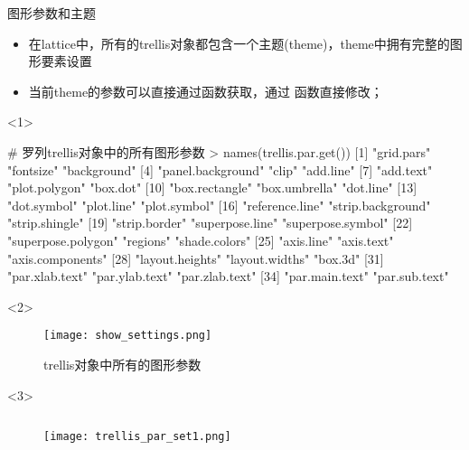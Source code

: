 \begin{frame}[t,fragile]{\subsecname}{图形参数和主题}
\begin{itemize}
\item 在lattice中，所有的trellis对象都包含一个主题(theme)，theme中拥有完整的图形要素设置
\item 当前theme的参数可以直接通过函数获取，通过
函数直接修改；
\end{itemize}

\begin{overlayarea}{\textwidth}{\textheight}
\begin{onlyenv}<1>
\begin{rcode}
# 罗列trellis对象中的所有图形参数
> names(trellis.par.get())
 [1] "grid.pars"         "fontsize"          "background"       
 [4] "panel.background"  "clip"              "add.line"         
 [7] "add.text"          "plot.polygon"      "box.dot"          
[10] "box.rectangle"     "box.umbrella"      "dot.line"         
[13] "dot.symbol"        "plot.line"         "plot.symbol"      
[16] "reference.line"    "strip.background"  "strip.shingle"    
[19] "strip.border"      "superpose.line"    "superpose.symbol" 
[22] "superpose.polygon" "regions"           "shade.colors"     
[25] "axis.line"         "axis.text"         "axis.components"  
[28] "layout.heights"    "layout.widths"     "box.3d"           
[31] "par.xlab.text"     "par.ylab.text"     "par.zlab.text"    
[34] "par.main.text"     "par.sub.text"    
\end{rcode}
\end{onlyenv}

\vspace{-10pt}
\begin{onlyenv}<2>
\begin{figure}[ht]
  \centering
  \texttt{[image: show\_settings.png]}
  \caption{trellis对象中所有的图形参数}
\end{figure}
\end{onlyenv}

\begin{onlyenv}<3>
\begin{figure}
 \begin{columns}
    \begin{column}[c]{.4\textwidth}
        \texttt{[image: trellis\_par\_set1.png]}
    \end{column}


\end{columns}
\end{figure}
\end{onlyenv}
\end{overlayarea}
\end{frame}
